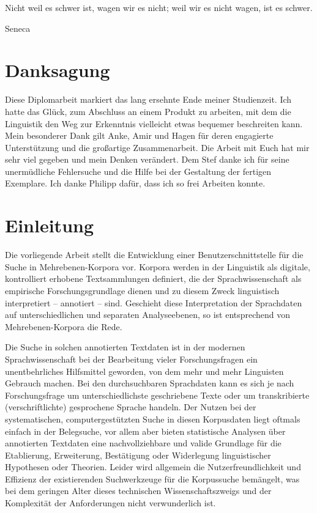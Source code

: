 
\epigraph{Nicht weil es schwer ist, wagen wir es nicht; weil wir es nicht wagen, ist es schwer.}
         {Seneca}

\vspace{310pt}
\begin{minipage}[b!]{1.0\linewidth}
\section*{Danksagung}
Diese Diplomarbeit markiert das lang ersehnte Ende meiner Studienzeit. Ich hatte das Glück, zum Abschluss an einem Produkt zu arbeiten, mit dem die Linguistik den Weg zur Erkenntnis vielleicht etwas bequemer beschreiten kann. Mein besonderer Dank gilt Anke, Amir und Hagen für deren engagierte Unterstützung und die großartige Zusammenarbeit. Die Arbeit mit Euch hat mir sehr viel gegeben und mein Denken verändert. Dem Stef danke ich für seine unermüdliche Fehlersuche und die Hilfe bei der Gestaltung der fertigen Exemplare. Ich danke Philipp dafür, dass ich so frei Arbeiten konnte.
\end{minipage}

\newpage
\section{Einleitung}

Die vorliegende Arbeit stellt die Entwicklung einer Benutzerschnittstelle für die Suche
in Mehrebenen-Korpora vor. Korpora werden in der Linguistik als digitale, kontrolliert erhobene Textsammlungen definiert, die der Sprachwissenschaft als empirische Forschungsgrundlage dienen und zu diesem Zweck linguistisch interpretiert -- annotiert -- sind. Geschieht diese Interpretation der Sprachdaten auf unterschiedlichen und separaten Analyseebenen, so ist entsprechend von Mehrebenen-Korpora die Rede.

Die Suche in solchen annotierten Textdaten ist in der modernen Sprachwissenschaft bei der Bearbeitung vieler Forschungsfragen ein unentbehrliches Hilfsmittel geworden, von dem mehr und mehr Linguisten Gebrauch machen. Bei den durchsuchbaren Sprachdaten kann es sich je nach Forschungsfrage um unterschiedlichste geschriebene Texte oder um transkribierte (verschriftlichte) gesprochene Sprache handeln. Der Nutzen bei der systematischen, computergestützten Suche in diesen Korpusdaten liegt oftmals einfach in der Belegsuche, vor allem aber bieten statistische Analysen über annotierten Textdaten eine nachvollziehbare und valide Grundlage für die Etablierung, Erweiterung, Bestätigung oder Widerlegung linguistischer Hypothesen oder Theorien. 
Leider wird allgemein die Nutzerfreundlichkeit und Effizienz der existierenden Suchwerkzeuge für die Korpussuche bemängelt, was bei dem geringen Alter dieses technischen Wissenschaftszweigs und der Komplexität der Anforderungen nicht verwunderlich ist. 

